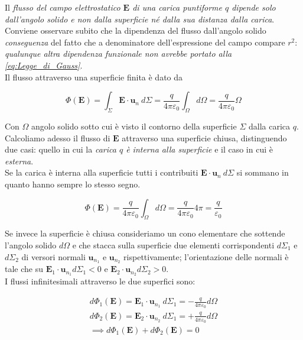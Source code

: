 Il \emph{flusso del campo elettrostatico $\mathbf{E}$ di una carica puntiforme $q$ dipende solo dall'angolo solido e non dalla superficie né dalla sua distanza dalla carica}.\\

Conviene osservare subito che la dipendenza del flusso dall'angolo solido \emph{conseguenza} del fatto che a denominatore dell'espressione del campo compare $r^2$: \emph{qualunque altra dipendenza funzionale non avrebbe portato alla \ref{eq:Legge_di_Gauss}}.\\
Il flusso attraverso una superficie finita è dato da 

\begin{equation*}
    \Phi(\mathbf{E}) = \int_{\Sigma} \mathbf{E} \cdot \mathbf{u}_n \ d \Sigma
 = \frac{q}{4 \pi \varepsilon_0} \int_{\Omega} d \Omega = \frac{q}{4 \pi \varepsilon_0} \Omega
\end{equation*}

Con $\Omega$ angolo solido sotto cui è visto il contorno della superficie $\Sigma$ dalla carica $q$.\\

Calcoliamo adesso il flusso di $\mathbf{E}$ attraverso una superficie chiusa, distinguendo due casi: quello in cui la \emph{carica $q$ è interna alla superficie} e il caso in cui è \emph{esterna}.\\

Se la carica è interna alla superficie tutti i contribuiti $\mathbf{E} \cdot \mathbf{u}_n \ d\Sigma$ si sommano in quanto hanno sempre lo stesso segno.

\begin{equation*}
    \Phi (\mathbf{E}) = \frac{q}{4\pi\varepsilon_0} \int_{\Omega} d\Omega = \frac{q}{4\pi\varepsilon_0} 4 \pi = \frac{q}{\varepsilon_0}
\end{equation*}

Se invece la superficie è chiusa consideriamo un cono elementare che sottende l'angolo solido $d \Omega$ e che stacca sulla superficie due elementi corrispondenti $d \Sigma_1$ e $d \Sigma_2$ di versori normali $\mathbf{u}_{n_1}$ e $\mathbf{u}_{n_2}$ rispettivamente; l'orientazione delle normali è tale che su $\mathbf{E}_1 \cdot \mathbf{u}_{n_1} d\Sigma_1 < 0$ e $\mathbf{E}_2 \cdot \mathbf{u}_{n_2} d\Sigma_2 > 0$.\\
I flussi infinitesimali attraverso le due superfici sono:

\begin{align*}
    d \Phi_1(\mathbf{E}) = \mathbf{E}_1 \cdot \mathbf{u}_{n_1} \ d \Sigma_1 = - \frac{q}{4 \pi \varepsilon_0} d\Omega \\ d\Phi_2 (\mathbf{E}) = \mathbf{E}_2 \cdot \mathbf{u}_{n_2} \ d \Sigma_1 = + \frac{q}{4 \pi \varepsilon_0} d\Omega \\ \implies d\Phi_1(\mathbf{E}) + d\Phi_2 (\mathbf{E}) = 0 
\end{align*}

